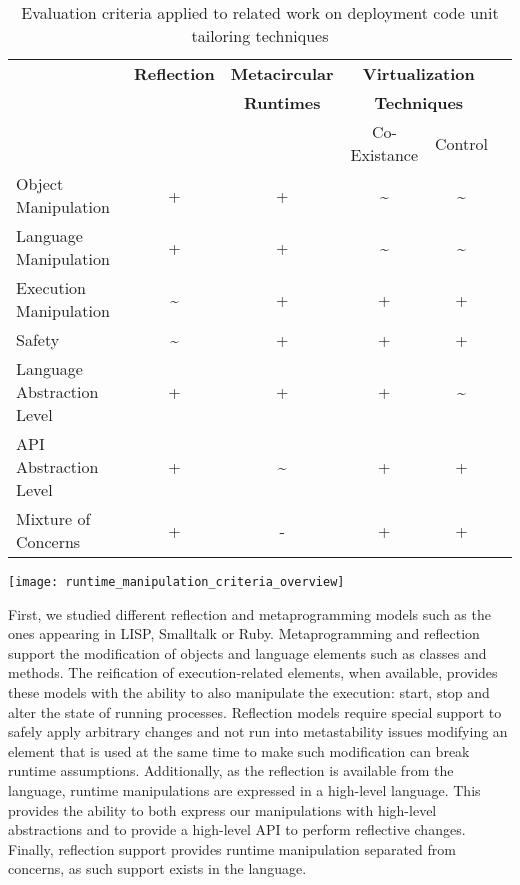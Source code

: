 \begin{table}[ht]
 \small
 	\centering
 	\begin{tabular}{lccccc}
	
\toprule
 			& \textbf{Reflection}
 			& \textbf{Metacircular}
			& \multicolumn{2}{c}{\textbf{Virtualization}}\\
 			& \textbf{}
 			& \textbf{Runtimes}
			& \multicolumn{2}{c}{\textbf{Techniques}}\\
			&&&Co-Existance&Control\\
 \toprule

		Object Manipulation
 			& + & + & \textasciitilde & \textasciitilde\\
		\hline
		Language
		Manipulation
 			& + & + & \textasciitilde & \textasciitilde\\
		\hline
		Execution Manipulation
 			& \textasciitilde & + & + & + \\
		\hline
		Safety
 			& \textasciitilde & + & + & + \\
		\hline
		Language Abstraction
		Level
 			& + & + & + & \textasciitilde \\
		\hline
		API Abstraction
		Level
 			& + & \textasciitilde & + & + \\
		\hline
		Mixture of Concerns
 			& + & - & + & + \\
 	 \bottomrule
 	\end{tabular}
	\texttt{[image: runtime\_manipulation\_criteria\_overview]}
 	\caption{Evaluation criteria applied to related work on deployment code unit tailoring techniques}
 	\label{tb:comparison_runtime_manipulation}
 \end{table}

First, we studied different reflection and metaprogramming models such as the ones appearing in LISP, Smalltalk or Ruby. Metaprogramming and reflection support the modification of objects and language elements such as classes and methods. The reification of execution-related elements, when available, provides these models with the ability to also manipulate the execution: start, stop and alter the state of running processes. Reflection models require special support to safely apply arbitrary changes and not run into metastability issues \ie modifying an element that is used at the same time to make such modification can break runtime assumptions. Additionally, as the reflection is available from the language, runtime manipulations are expressed in a high-level language. This provides the ability to both express our manipulations with high-level abstractions and to provide a high-level API to perform reflective changes. Finally, reflection support provides runtime manipulation separated from \VM concerns, as such support exists in the language.

